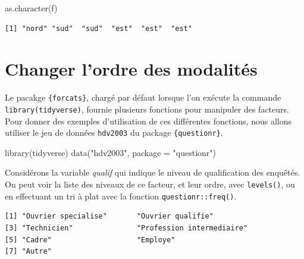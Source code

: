 \documentclass[
  letterpaper,
  DIV=11,
  numbers=noendperiod,
  oneside]{scrreprt}
\newenvironment{Shaded}{\begin{snugshade}}{\end{snugshade}}
\newcommand{\AttributeTok}[1]{\textcolor[rgb]{0.40,0.45,0.13}{#1}}
\newcommand{\FunctionTok}[1]{\textcolor[rgb]{0.28,0.35,0.67}{#1}}
\newcommand{\NormalTok}[1]{\textcolor[rgb]{0.00,0.23,0.31}{#1}}
\newcommand{\SpecialCharTok}[1]{\textcolor[rgb]{0.37,0.37,0.37}{#1}}
\newcommand{\StringTok}[1]{\textcolor[rgb]{0.13,0.47,0.30}{#1}}
\begin{document}
\begin{Shaded}
\begin{Highlighting}[]
\FunctionTok{as.character}\NormalTok{(f)}
\end{Highlighting}
\end{Shaded}

\begin{verbatim}
[1] "nord" "sud"  "sud"  "est"  "est"  "est" 
\end{verbatim}

\hypertarget{changer-lordre-des-modalituxe9s}{%
\section{Changer l'ordre des
modalités}\label{changer-lordre-des-modalituxe9s}}

Le pacakge \texttt{\{forcats\}}, chargé par défaut lorsque l'on exécute
la commande \texttt{library(tidyverse)}, fournie plusieurs fonctions
pour manipuler des facteurs. Pour donner des exemples d'utilisation de
ces différentes fonctions, nous allons utiliser le jeu de données
\texttt{hdv2003} du package \texttt{\{questionr\}}.

\begin{Shaded}
\begin{Highlighting}[]
\FunctionTok{library}\NormalTok{(tidyverse)}
\FunctionTok{data}\NormalTok{(}\StringTok{"hdv2003"}\NormalTok{, }\AttributeTok{package =} \StringTok{"questionr"}\NormalTok{)}
\end{Highlighting}
\end{Shaded}

Considérons la variable \emph{qualif} qui indique le niveau de
qualification des enquêtés. On peut voir la liste des niveaux de ce
facteur, et leur ordre, avec \texttt{levels()}, ou en effectuant un tri
à plat avec la fonction \texttt{questionr::freq()}.

\begin{Shaded}
\end{Shaded}

\begin{verbatim}
[1] "Ouvrier specialise"       "Ouvrier qualifie"        
[3] "Technicien"               "Profession intermediaire"
[5] "Cadre"                    "Employe"                 
[7] "Autre"                   
\end{verbatim}
\end{document}
